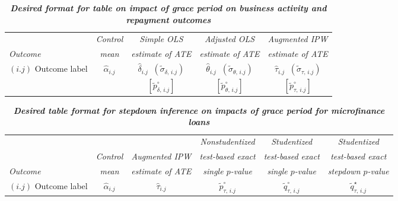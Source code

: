\documentclass[12pt]{article}
\begin{document}
\begin{table}[!ht]
\begin{center}
\caption*{\textbf{\textit{Desired format for table on impact of grace period on business activity and repayment outcomes}}}
\footnotesize
{}
\begin{tabular}{l|c@{\hskip 10pt}|c@{\hskip 10pt}|c@{\hskip 10pt}|c}
\hline\hline
 & \textit{Control} & \textit{Simple OLS} & \textit{Adjusted OLS} & \textit{Augmented IPW} \\ [-1mm]
 \textit{Outcome} & \textit{mean} & \textit{estimate of ATE} & \textit{estimate of ATE} & \textit{estimate of ATE} \\ \hline \hline
 $ (i.j) $ Outcome label & $ \widehat{\alpha}_{i.j} $  & $ \widehat{\delta}_{i.j} \;\; ( \widetilde{\sigma}_{\delta,\,i.j} ) $  & $ \widehat{\theta}_{i.j} \;\; ( \widetilde{\sigma}_{\theta,\,i.j} ) $  & $ \widehat{\tau}_{i.j} \;\; ( \widetilde{\sigma}_{\tau,\,i.j} ) $ \\ [-1mm]
 &  & $ [\tilde{p}^\circ_{\delta,\,i.j}] $ & $ [\tilde{p}^\circ_{\theta,\,i.j}] $ & $ [\tilde{p}^\circ_{\tau,\,i.j}] $ \\ \hline\hline
\end{tabular}
\end{center}
\end{table}
\vspace{-7mm}
\begin{table}[!ht]
\begin{center}
\caption*{\textbf{\textit{Desired table format for stepdown inference on impacts of grace period for microfinance loans}}}
\footnotesize
{}
\begin{tabular}{l|cc|ccc}
\hline\hline
 &  &  & \textit{Nonstudentized}  & \textit{Studentized} & \textit{Studentized}  \\ [-1mm]
 & \textit{Control} & \textit{Augmented IPW} & \textit{test-based exact} & \textit{test-based exact} & \textit{test-based exact}  \\ [-1mm]
 \textit{Outcome} & \textit{mean} & \textit{estimate of ATE} & \textit{single $ p$-value} & \textit{single $ p$-value} & \textit{stepdown $ p$-value}  \\ \hline 
 $ (i.j) $ Outcome label & $  \widehat{\alpha}_{i.j} $ & $ \widehat{\tau}_{i.j} $ & $ \tilde{p}^\circ_{\tau,\,i.j} $ & $ \tilde{q}^\circ_{\tau,\,i.j} $ & $ \tilde{q}^\star_{\tau,\,i.j} $ \\ \hline \hline
\end{tabular}
\end{center}
\end{table}
\vspace{-3mm}
\end{document}
